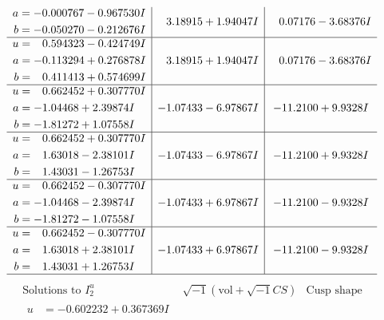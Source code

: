 \documentclass[1p]{elsarticle_modified}
\theoremstyle{definition}
\newcommand{\I}{\sqrt{-1}}
\begin{document}
$$\begin{array}{c|c|c}
\begin{aligned}
a &= -0.000767 - 0.967530 I \\
b &= -0.050270 - 0.212676 I\end{aligned}
 & \phantom{-}3.18915 + 1.94047 I & \phantom{-}0.07176 - 3.68376 I \\ \hline\begin{aligned}
u &= \phantom{-}0.594323 - 0.424749 I \\
a &= -0.113294 + 0.276878 I \\
b &= \phantom{-}0.411413 + 0.574699 I\end{aligned}
 & \phantom{-}3.18915 + 1.94047 I & \phantom{-}0.07176 - 3.68376 I \\ \hline\begin{aligned}
u &= \phantom{-}0.662452 + 0.307770 I \\
a &= -1.04468 + 2.39874 I \\
b &= -1.81272 + 1.07558 I\end{aligned}
 & -1.07433 - 6.97867 I & -11.2100 + 9.9328 I \\ \hline\begin{aligned}
u &= \phantom{-}0.662452 + 0.307770 I \\
a &= \phantom{-}1.63018 - 2.38101 I \\
b &= \phantom{-}1.43031 - 1.26753 I\end{aligned}
 & -1.07433 - 6.97867 I & -11.2100 + 9.9328 I \\ \hline\begin{aligned}
u &= \phantom{-}0.662452 - 0.307770 I \\
a &= -1.04468 - 2.39874 I \\
b &= -1.81272 - 1.07558 I\end{aligned}
 & -1.07433 + 6.97867 I & -11.2100 - 9.9328 I \\ \hline\begin{aligned}
u &= \phantom{-}0.662452 - 0.307770 I \\
a &= \phantom{-}1.63018 + 2.38101 I \\
b &= \phantom{-}1.43031 + 1.26753 I\end{aligned}
 & -1.07433 + 6.97867 I & -11.2100 - 9.9328 I\\
 \hline 
 \end{array}$$\newpage$$\begin{array}{c|c|c}  
\text{Solutions to }I^u_{2}& \I (\text{vol} + \sqrt{-1}CS) & \text{Cusp shape}\\
 \hline 
\begin{aligned}
u &= -0.602232 + 0.367369 I \\

\end{aligned}
\end{array}$$
\end{document}
